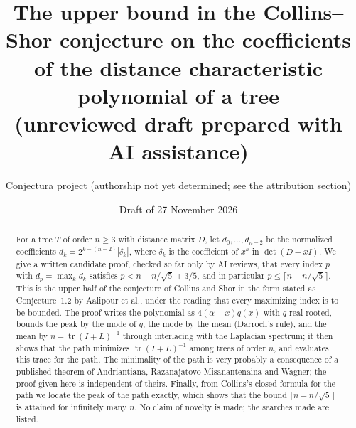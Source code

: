 \documentclass[11pt]{amsart}
\title[The upper bound in the Collins--Shor conjecture]{The upper bound in the
Collins--Shor conjecture on the coefficients of the distance characteristic
polynomial of a tree\\[0.5ex] \normalfont\small (unreviewed draft prepared with AI assistance)}
\author[Conjectura project (draft)]{Conjectura project (authorship not yet determined; see the attribution section)}
\date{Draft of 27 November 2026}
\theoremstyle{definition}
\theoremstyle{remark}
\newcommand{\tr}{\operatorname{tr}}
\begin{document}
\begin{abstract}
For a tree $T$ of order $n\ge 3$ with distance matrix $D$, let
$d_0,\dots,d_{n-2}$ be the normalized coefficients
$d_k=2^{k-(n-2)}|\delta_k|$, where $\delta_k$ is the coefficient of $x^k$ in
$\det(D-xI)$. We give a written candidate proof, checked so far only by AI
reviews, that every index $p$ with
$d_p=\max_k d_k$ satisfies $p<n-n/\sqrt5+3/5$, and in particular
$p\le\lceil n-n/\sqrt5\rceil$. This is the upper half of the conjecture of
Collins and Shor in the form stated as Conjecture~1.2 by Aalipour et al.,
under the reading that every maximizing index is to be bounded. The proof
writes the polynomial as $4(\alpha-x)q(x)$ with $q$ real-rooted, bounds the
peak by the mode of $q$, the mode by the mean (Darroch's rule), and the mean
by $n-\tr(I+L)^{-1}$ through interlacing with the Laplacian spectrum; it then
shows that the path minimizes $\tr(I+L)^{-1}$ among trees of order $n$, and
evaluates this trace for the path. The minimality of the path is very
probably a consequence of a published theorem of Andriantiana,
Razanajatovo Misanantenaina and Wagner; the proof given here is independent
of theirs. Finally, from Collins's closed formula for the path we locate the
peak of the path exactly, which shows that the bound
$\lceil n-n/\sqrt5\rceil$ is attained for infinitely many $n$. No claim of
novelty is made; the searches made are listed.
\end{abstract}

\maketitle

\begin{center}
\end{center}
\end{document}
